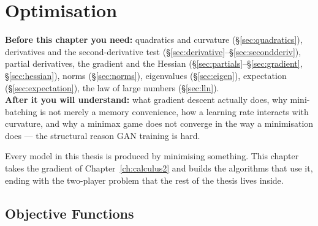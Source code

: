 \chapter{Optimisation}
\label{ch:optimisation}

\begin{tcolorbox}[feynbox={Sky}{BBg},title={Before and After}]
\textbf{Before this chapter you need:} quadratics and curvature
(\S\ref{sec:quadratics}), derivatives and the second-derivative test
(\S\ref{sec:derivative}--\S\ref{sec:secondderiv}), partial derivatives, the
gradient and the Hessian
(\S\ref{sec:partials}--\S\ref{sec:gradient}, \S\ref{sec:hessian}), norms
(\S\ref{sec:norms}), eigenvalues (\S\ref{sec:eigen}), expectation
(\S\ref{sec:expectation}), the law of large numbers (\S\ref{sec:lln}).\\
\textbf{After it you will understand:} what gradient descent actually does, why
mini-batching is not merely a memory convenience, how a learning rate interacts
with curvature, and why a minimax game does not converge in the way a
minimisation does --- the structural reason GAN training is hard.
\end{tcolorbox}

Every model in this thesis is produced by minimising something. This chapter
takes the gradient of Chapter~\ref{ch:calculus2} and builds the algorithms that
use it, ending with the two-player problem that the rest of the thesis lives
inside.

\section{Objective Functions}
\label{sec:objective}



